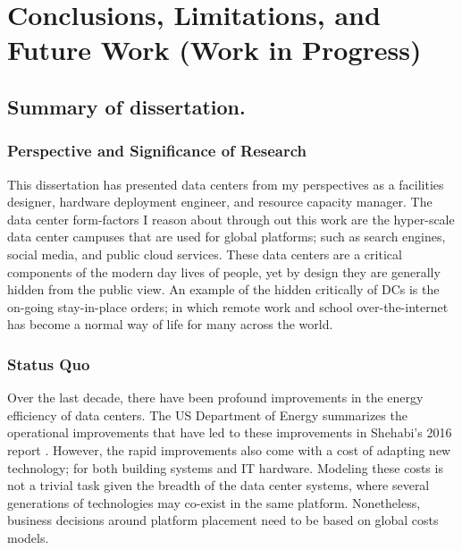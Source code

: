 \chapter{Conclusions, Limitations, and Future Work (Work in Progress)}
\label{chp:conclusions}

\section{Summary of dissertation.}

\subsection{Perspective and Significance of Research}
This dissertation has presented data centers from my perspectives as a facilities designer, hardware deployment engineer, and resource capacity manager. The data center form-factors I reason about through out this work are the hyper-scale data center campuses that are used for global platforms; such as search engines, social media, and public cloud services. These data centers are a critical components of the modern day lives of people, yet by design they are generally hidden from the public view. An example of the hidden critically of DCs is the on-going stay-in-place orders; in which remote work and school over-the-internet has become a normal way of life for many across the world. 



\subsection{Status Quo}
Over the last decade, there have been profound improvements in the energy efficiency of data centers. The US Department of Energy summarizes the operational improvements that have led to these improvements in Shehabi's 2016 report \cite{Shehabi16}. However, the rapid improvements also come with a cost of adapting new technology; for both building systems and IT hardware. Modeling these costs is not a trivial task given the breadth of the data center systems, where several generations of technologies may co-exist in the same platform. Nonetheless, business decisions around platform placement need to be based on global costs models. 


